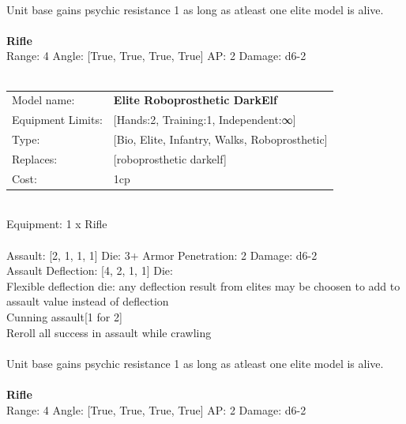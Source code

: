 {\ \\
Unit base gains psychic resistance 1 as long as atleast one elite model is alive.\\ 

\ \\
{\bf Rifle } \\



Range: 4  Angle: [True, True, True, True] AP: 2 Damage: d6-2 \\




 
\ \\

\noindent
\begin{tabular}{ll}
Model name: &{\bf Elite Roboprosthetic DarkElf } \\
Equipment Limits: &[Hands:2, Training:1, Independent:∞] \\
Type: &[Bio, Elite, Infantry, Walks, Roboprosthetic] \\
Replaces: &[roboprosthetic darkelf] \\
Cost: & 1cp\\
\end{tabular}
\ \\
Equipment: 1 x Rifle \\
\ \\
Assault: [2, 1, 1, 1] Die: 3+ Armor Penetration: 2 Damage: d6-2 \\
Assault Deflection: [4, 2, 1, 1] Die: \\
\indent Flexible deflection die: any deflection result from elites may be choosen to add to assault value instead of deflection\\ 
Cunning assault[1 for 2]\\ 
Reroll all success in assault while crawling\\ 
 
\ \\
Unit base gains psychic resistance 1 as long as atleast one elite model is alive.\\ 

\ \\
{\bf Rifle } \\



Range: 4  Angle: [True, True, True, True] AP: 2 Damage: d6-2 \\




 
\ \\

}
